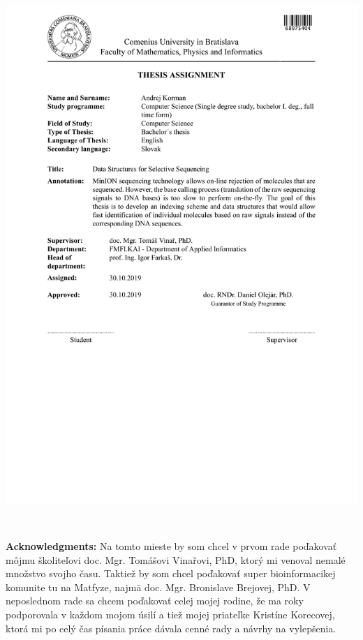 \documentclass[12pt, twoside]{book}
\begin{document}
\hspace{-2cm}\includegraphics[width=1.1\textwidth]{images/zadanie-en}


\frontmatter

\setcounter{page}{3}
\newpage 
~

\vfill
{\bf Acknowledgments:} Na tomto mieste by som chcel v prvom rade poďakovať môjmu
školiteľovi doc. Mgr. Tomášovi Vinařovi, PhD, ktorý mi venoval nemalé množstvo svojho
času. Taktiež by som chcel poďakovať super bioinformacikej komunite tu na Matfyze, najmä
doc. Mgr. Bronislave Brejovej, PhD. V neposlednom rade sa chcem poďakovať celej mojej
rodine, že ma roky podporovala v každom mojom úsilí a tiež mojej priateľke Kristíne Korecovej,
ktorá mi po celý čas písania práce dávala cenné rady a návrhy na vylepšenia.
\end{document}
